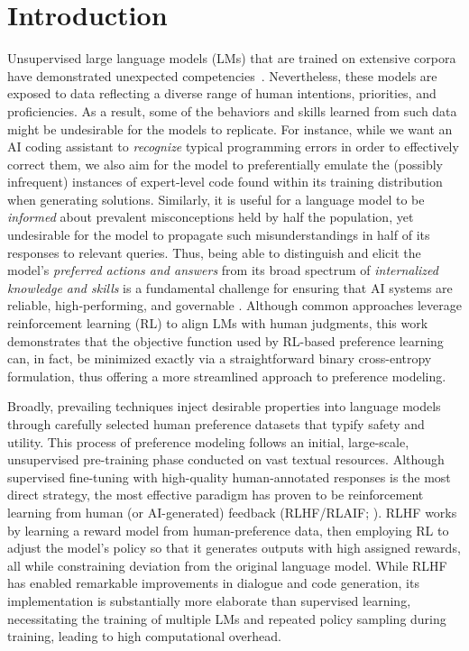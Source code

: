 \section{Introduction}
Unsupervised large language models (LMs) that are trained on extensive corpora have demonstrated unexpected competencies~\citep{chowdhery2022palm, brown2020language, touvron2023llama, bubeck2023sparks}. Nevertheless, these models are exposed to data reflecting a diverse range of human intentions, priorities, and proficiencies. As a result, some of the behaviors and skills learned from such data might be undesirable for the models to replicate. For instance, while we want an AI coding assistant to \textit{recognize} typical programming errors in order to effectively correct them, we also aim for the model to preferentially emulate the (possibly infrequent) instances of expert-level code found within its training distribution when generating solutions. Similarly, it is useful for a language model to be \textit{informed} about prevalent misconceptions held by half the population, yet undesirable for the model to propagate such misunderstandings in half of its responses to relevant queries. Thus, being able to distinguish and elicit the model’s \emph{preferred actions and answers} from its broad spectrum of \textit{internalized knowledge and skills} is a fundamental challenge for ensuring that AI systems are reliable, high-performing, and governable \citep{ouyang2022training}. Although common approaches leverage reinforcement learning (RL) to align LMs with human judgments, this work demonstrates that the objective function used by RL-based preference learning can, in fact, be minimized exactly via a straightforward binary cross-entropy formulation, thus offering a more streamlined approach to preference modeling.

Broadly, prevailing techniques inject desirable properties into language models through carefully selected human preference datasets that typify safety and utility. This process of preference modeling follows an initial, large-scale, unsupervised pre-training phase conducted on vast textual resources. Although supervised fine-tuning with high-quality human-annotated responses is the most direct strategy, the most effective paradigm has proven to be reinforcement learning from human (or AI-generated) feedback (RLHF/RLAIF; \citep{christiano2017deep,bai2022constitutional}). RLHF works by learning a reward model from human-preference data, then employing RL to adjust the model’s policy so that it generates outputs with high assigned rewards, all while constraining deviation from the original language model. While RLHF has enabled remarkable improvements in dialogue and code generation, its implementation is substantially more elaborate than supervised learning, necessitating the training of multiple LMs and repeated policy sampling during training, leading to high computational overhead.

